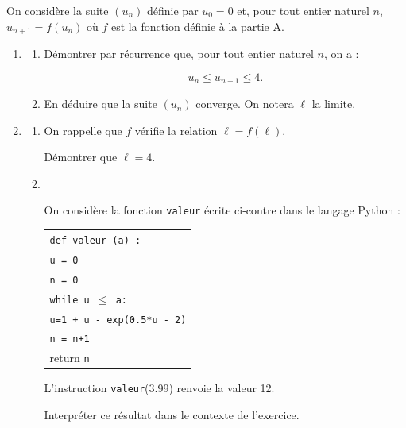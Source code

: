 \documentclass[10pt]{article}
\begin{document}
\medskip

On considère la suite $\left(u_n\right)$ définie par $u_0 = 0$ et, pour tout entier naturel $n$,
\: $u_{n+1} = f\left(u_n\right)$ où $f$ est la fonction définie à la partie A.

\medskip

\begin{enumerate}
\item 
	\begin{enumerate}
		\item Démontrer par récurrence que, pour tout entier naturel $n$, on a : 
		
		\[u_n \leqslant u_{n+1} \leqslant 4.\]
		
		\item En déduire que la suite $\left(u_n\right)$ converge. On notera $\ell$ la limite.
	\end{enumerate}	
\item 
	\begin{enumerate}
		\item On rappelle que $f$ vérifie la relation $\ell = f(\ell)$.
		
Démontrer que $\ell  = 4$.
		\item ~
		
\begin{minipage}{0.48\linewidth}On considère la fonction \texttt{valeur} écrite ci-contre dans le langage Python :
		\end{minipage}\hfill 
\begin{minipage}{0.48\linewidth}
\begin{tabular}{|l|}\hline
\texttt{def valeur (a) :}\\
\quad \texttt{u = 0}\\
\quad \texttt{n = 0}\\
\quad \texttt{while u $\leqslant$ a:}\\
\qquad \texttt{u=1 + u - exp(0.5*u - 2)}\\
\qquad \texttt{n = n+1}\\ 
\quad return \texttt{n}\\ \hline
\end{tabular}
\end{minipage}

L'instruction \texttt{valeur}(3.99) renvoie la valeur 12.

Interpréter ce résultat dans le contexte de l'exercice.
	\end{enumerate}
\end{enumerate}

\bigskip
\end{document}
